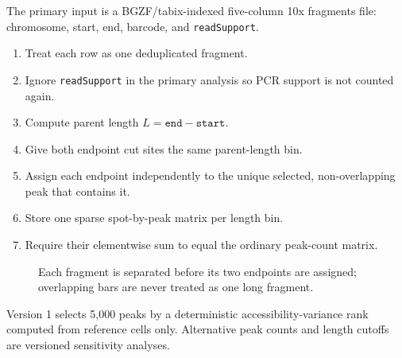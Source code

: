 \documentclass[11pt]{article}
\begin{document}
The primary input is a BGZF/tabix-indexed five-column 10x fragments file:
chromosome, start, end, barcode, and \texttt{readSupport}.

\begin{enumerate}[leftmargin=2em]
  \item Treat each row as one deduplicated fragment.
  \item Ignore \texttt{readSupport} in the primary analysis so PCR support is not
  counted again.
  \item Compute parent length \(L=\texttt{end}-\texttt{start}\).
  \item Give both endpoint cut sites the same parent-length bin.
  \item Assign each endpoint independently to the unique selected,
  non-overlapping peak that contains it.
  \item Store one sparse spot-by-peak matrix per length bin.
  \item Require their elementwise sum to equal the ordinary peak-count matrix.
\end{enumerate}

\begin{figure}[H]
\centering
{}
\caption{Each fragment is separated before its two endpoints are assigned; overlapping bars are never treated as one long fragment.}
\end{figure}

Version 1 selects 5,000 peaks by a deterministic accessibility-variance rank
computed from reference cells only. Alternative peak counts and length cutoffs
are versioned sensitivity analyses.
\end{document}
